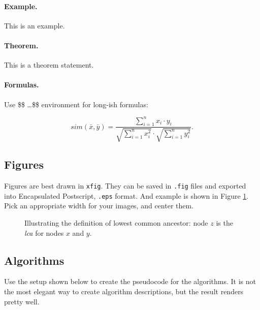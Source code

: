 \documentclass[10pt]{article}
\begin{document}
\paragraph{Example.} This is an example.

\paragraph{Theorem.} This is a theorem statement.

\paragraph{Formulas.} Use \$\$ \ldots \$\$ environment for long-ish formulas:

$$ sim(\bar{x},\bar{y}) = \frac{\sum_{i=1}^{n} x_i\cdot y_i}{\sqrt{\sum_{i=1}^{n}
x_i^2}\cdot \sqrt{\sum_{i=1}^{n}y_i^2}}.$$


\subsection*{Figures}

 Figures are best drawn in \texttt{xfig}. They can be saved in \texttt{.fig} files
and exported into Encapsulated Postscript, \texttt{.eps} format. And example is
shown in Figure \ref{fig:lca}. Pick an appropriate width for your images, and
center them.

\begin{figure}
\begin{center}
\end{center}
\caption{Illustrating the definition of lowest common ancestor: node $z$ is
the \textit{lca} for nodes $x$ and $y$.}\label{fig:lca}
\end{figure}


\subsection*{Algorithms}

Use the setup shown below to create the pseudocode for the algorithms.
It is not the most elegant way to create algorithm descriptions, but the result
renders pretty well.


\end{document}
